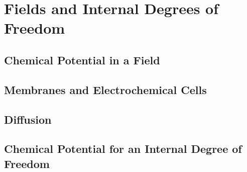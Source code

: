 \chapter{Fields and Internal Degrees of Freedom}
\section{Chemical Potential in a Field}
\section{Membranes and Electrochemical Cells}
\section{Diffusion}
\section{Chemical Potential for an Internal Degree of Freedom}